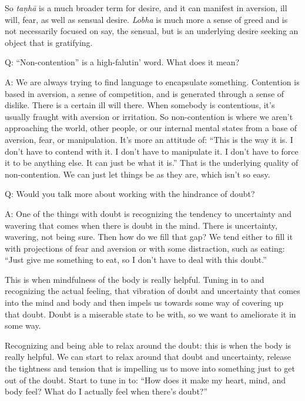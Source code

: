 So \emph{taṇhā} is a much broader term for desire, and it can manifest
in aversion, ill will, fear, as well as sensual desire. \emph{Lobha} is
much more a sense of greed and is not necessarily focused on say, the
sensual, but is an underlying desire seeking an object that is
gratifying.

\vspace{\the\qaskip}
Q: “Non-contention” is a high-falutin’ word. What does it mean?

\vspace{\the\qaskip}
A: We are always trying to find language to encapsulate something.
Contention is based in aversion, a sense of competition, and is
generated through a sense of dislike. There is a certain ill will there.
When somebody is contentious, it’s usually fraught with aversion or
irritation. So non-contention is where we aren’t approaching the world,
other people, or our internal mental states from a base of aversion,
fear, or manipulation. It’s more an attitude of: “This is the way it is.
I don’t have to contend with it. I don’t have to manipulate it. I don’t
have to force it to be anything else. It can just be what it is.” That
is the underlying quality of non-contention. We can just let things be
as they are, which isn’t so easy.

\vspace{\the\qaskip}
Q: Would you talk more about working with the hindrance of doubt?

\vspace{\the\qaskip}
A: One of the things with doubt is recognizing the tendency to
uncertainty and wavering that comes when there is doubt in the mind.
There is uncertainty, wavering, not being sure. Then how do we fill that
gap? We tend either to fill it with projections of fear and aversion or
with some distraction, such as eating: “Just give me something to eat,
so I don’t have to deal with this doubt.”

This is when mindfulness of the body is really helpful. Tuning in to and
recognizing the actual feeling, that vibration of doubt and uncertainty
that comes into the mind and body and then impels us towards some way of
covering up that doubt. Doubt is a miserable state to be with, so we
want to ameliorate it in some way.

Recognizing and being able to relax around the doubt: this is when the
body is really helpful. We can start to relax around that doubt and
uncertainty, release the tightness and tension that is impelling us to
move into something just to get out of the doubt. Start to tune in to:
“How does it make my heart, mind, and body feel? What do I actually feel
when there’s doubt?”

